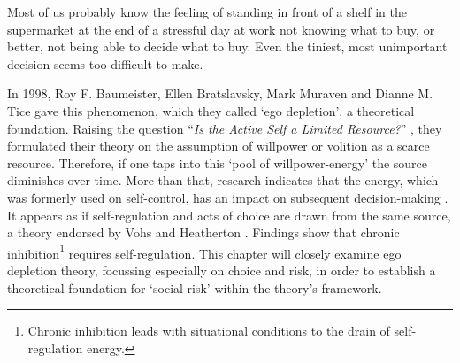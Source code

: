 \onehalfspacing
Most of us probably know the feeling of standing in front of a shelf in the supermarket at the end of a stressful day at work not knowing what to buy, or better, not being able to decide what to buy. Even the tiniest, most unimportant decision seems too difficult to make.\par
In 1998, Roy F. Baumeister, Ellen Bratslavsky, Mark Muraven and Dianne M. Tice gave this phenomenon, which they called ‘ego depletion’, a theoretical foundation. Raising the question “\emph{Is the Active Self a Limited Resource?}” \citep{baumeister1998ego}, they formulated their theory on the assumption of willpower or volition as a scarce resource. Therefore, if one taps into this ‘pool of willpower-energy’ the source diminishes over time. More than that, research indicates that the energy, which was formerly used on self-control, has an impact on subsequent decision-making \citep{muraven1998self}. It appears as if self-regulation and acts of choice are drawn from the same source, a theory endorsed by Vohs and Heatherton \citep{vohs2000self}. Findings show that chronic inhibition\footnote{Chronic inhibition leads with situational conditions to the drain of self-regulation energy.\citep{vohs2000self} } requires self-regulation. This chapter will closely examine ego depletion theory, focussing especially on choice and risk, in order to establish a theoretical foundation for ‘social risk’ within the theory’s framework.

